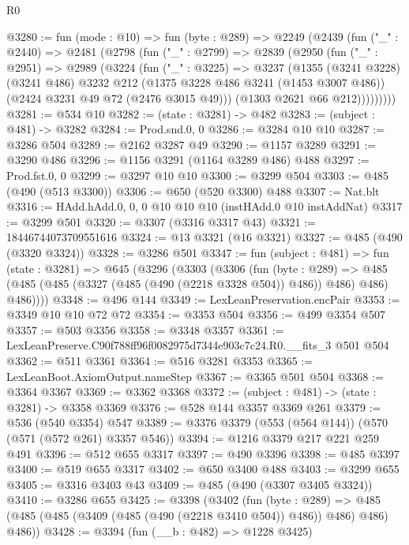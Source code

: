 \begin{lexlean}{R0}
\begin{coremodule}
@3280 := fun (mode : @10) =>
  fun (byte : @289) =>
  @2249
    (@2439
      (fun ("_" : @2440) =>
      @2481
        (@2798
          (fun ("_" : @2799) =>
          @2839
            (@2950
              (fun ("_" : @2951) =>
              @2989
                (@3224
                  (fun ("_" : @3225) =>
                  @3237
                    (@1355
                      (@3241 @3228)
                      (@3241 @486)
                      @3232
                      @212
                      (@1375 @3228 @486 @3241 (@1453 @3007 @486))
                      (@2424 @3231 @49 @72 (@2476 @3015 @49)))
                    (@1303 @2621 @66 @212)))))))))
@3281 := @534 @10
@3282 := (state : @3281) -> @482
@3283 := (subject : @481) -> @3282
@3284 := Prod.snd.{0, 0}
@3286 := @3284 @10 @10
@3287 := @3286 @504
@3289 := @2162 @3287 @49
@3290 := @1157 @3289
@3291 := @3290 @486
@3296 := @1156 @3291 (@1164 @3289 @486) @488
@3297 := Prod.fst.{0, 0}
@3299 := @3297 @10 @10
@3300 := @3299 @504
@3303 := @485 (@490 (@513 @3300))
@3306 := @650 (@520 @3300) @488
@3307 := Nat.blt
@3316 := HAdd.hAdd.{0, 0, 0} @10 @10 @10 (instHAdd.{0} @10 instAddNat)
@3317 := @3299 @501
@3320 := @3307 (@3316 @3317 @43)
@3321 := 18446744073709551616
@3324 := @13 @3321 (@16 @3321)
@3327 := @485 (@490 (@3320 @3324))
@3328 := @3286 @501
@3347 := fun (subject : @481) =>
  fun (state : @3281) =>
  @645
    (@3296
      (@3303
        (@3306
          (fun (byte : @289) =>
          @485 (@485 (@485 (@3327 (@485 (@490 (@2218 @3328 @504)) @486)) @486) @486) @486))))
@3348 := @496 @144
@3349 := LexLeanPreservation.encPair
@3353 := @3349 @10 @10 @72 @72
@3354 := @3353 @504
@3356 := @499 @3354 @507
@3357 := @503 @3356
@3358 := @3348 @3357
@3361 := LexLeanPreserve.C90f788ff96f0082975d7344e903c7c24.R0.__fits_3 @501 @504
@3362 := @511 @3361
@3364 := @516 @3281 @3353
@3365 := LexLeanBoot.AxiomOutput.nameStep
@3367 := @3365 @501 @504
@3368 := @3364 @3367
@3369 := @3362 @3368
@3372 := (subject : @481) -> (state : @3281) -> @3358 @3369
@3376 := @528 @144 @3357 @3369 @261
@3379 := @536 (@540 @3354) @547
@3389 := @3376 @3379 (@553 (@564 @144)) (@570 (@571 (@572 @261) @3357 @546))
@3394 := @1216 @3379 @217 @221 @259 @491
@3396 := @512 @655 @3317
@3397 := @490 @3396
@3398 := @485 @3397
@3400 := @519 @655 @3317
@3402 := @650 @3400 @488
@3403 := @3299 @655
@3405 := @3316 @3403 @43
@3409 := @485 (@490 (@3307 @3405 @3324))
@3410 := @3286 @655
@3425 := @3398
    (@3402
      (fun (byte : @289) =>
      @485 (@485 (@485 (@3409 (@485 (@490 (@2218 @3410 @504)) @486)) @486) @486) @486))
@3428 := @3394 (fun (__b : @482) => @1228 @3425)

\end{coremodule}
\end{lexlean}
